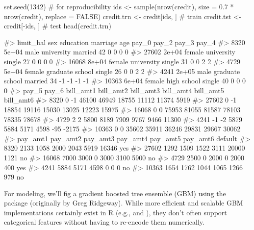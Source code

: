 \begin{Schunk}
\begin{Sinput}
set.seed(1342)  # for reproducibility
ids <- sample(nrow(credit), size = 0.7 * nrow(credit), replace = FALSE)
credit.trn <- credit[ids, ]  # train
credit.tst <- credit[-ids, ]  # test
head(credit.trn)
\end{Sinput}
\begin{Soutput}
#>       limit_bal    sex       education marriage age pay_0 pay_2 pay_3 pay_4
#> 8320      5e+04   male      university  married  42     0     0     0     0
#> 27602     2e+04 female      university   single  27     0     0     0     0
#> 16068     8e+04 female      university   single  31     0     0     2     2
#> 4729      5e+04 female graduate school   single  26     0     0     2     2
#> 4241      2e+05   male graduate school  married  34    -1    -1    -1    -1
#> 10363     6e+04 female     high school   single  40     0     0     0     0
#>       pay_5 pay_6 bill_amt1 bill_amt2 bill_amt3 bill_amt4 bill_amt5 bill_amt6
#> 8320      0    -1     46100     46949     18755     11112     11374      5919
#> 27602     0    -1     18854     19116     15030     13025     12223     15975
#> 16068     0     0     75953     81055     81587     78103     78335     78678
#> 4729      2     2      5800      8189      7909      9767      9466     11300
#> 4241     -1    -2      5879      5884      5171      4598       -95     -2175
#> 10363     0     0     35602     35911     36246     29831     29667     30062
#>       pay_amt1 pay_amt2 pay_amt3 pay_amt4 pay_amt5 pay_amt6 default
#> 8320      2133     1058     2000     2043     5919    16346     yes
#> 27602     1292     1509     1522     3111    20000     1121      no
#> 16068     7000     3000        0     3000     3100     5900      no
#> 4729      2500        0     2000        0     2000      400     yes
#> 4241      5884     5171     4598        0        0        0      no
#> 10363     1654     1762     1044     1065     1266      979      no
\end{Soutput}
\end{Schunk}

For modeling, we'll fig a gradient boosted tree ensemble (GBM) using the
 package (originally by Greg Ridgeway). While more
efficient and scalable GBM implementations certainly exist in R (e.g.,
 and ), they don't often support categorical
features without having to re-encode them numerically.

